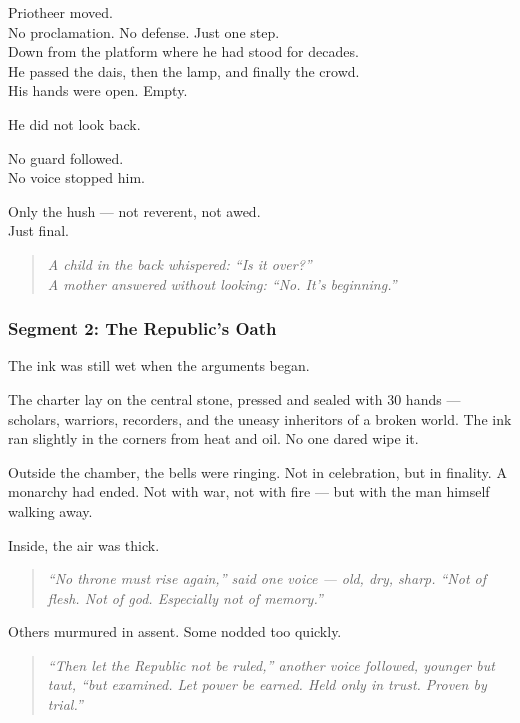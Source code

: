 \documentclass[9pt]{article}
\begin{document}
Priotheer moved.\\
No proclamation. No defense. Just one step.\\
Down from the platform where he had stood for decades.\\
He passed the dais, then the lamp, and finally the crowd.\\
His hands were open. Empty.

He did not look back.

No guard followed.\\
No voice stopped him.

Only the hush --- not reverent, not awed.\\
Just final.

\begin{quote}
\textit{A child in the back whispered: “Is it over?”}\\
\textit{A mother answered without looking: “No. It’s beginning.”}
\end{quote}

\newpage

\subsubsection*{Segment 2: The Republic’s Oath}

The ink was still wet when the arguments began.

The charter lay on the central stone, pressed and sealed with 30 hands --- scholars, warriors, recorders, and the uneasy inheritors of a broken world. The ink ran slightly in the corners from heat and oil. No one dared wipe it.

Outside the chamber, the bells were ringing. Not in celebration, but in finality. A monarchy had ended. Not with war, not with fire --- but with the man himself walking away.

Inside, the air was thick.

\begin{quote}
\textit{“No throne must rise again,” said one voice --- old, dry, sharp. “Not of flesh. Not of god. Especially not of memory.”}
\end{quote}

Others murmured in assent. Some nodded too quickly.

\begin{quote}
\textit{“Then let the Republic not be ruled,” another voice followed, younger but taut, “but examined. Let power be earned. Held only in trust. Proven by trial.”}
\end{quote}
\end{document}
